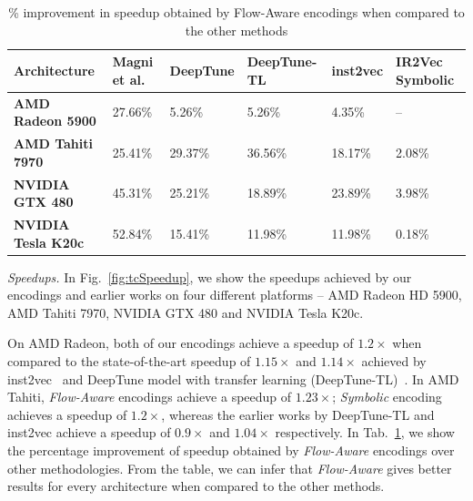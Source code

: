 \begin{table}[h]
\centering
  \caption{\% improvement in speedup obtained by Flow-Aware encodings when compared to the other methods}
  \label{tab:predictionSpeedup-tc}    \small
  \begin{tabular}{p{2.5cm}p{1.9cm}p{1.6cm}p{1.5cm}p{2.2cm}p{1.5cm}}
    \hline
    \textbf{Architecture} & \textbf{Magni et al. \cite{o2013portable-grewe}} & \textbf{DeepTune \cite{cummins2017end2end}} & \textbf{DeepTune-TL \cite{cummins2017end2end}} & \textbf{inst2vec \cite{ncc}}\footnotemark  & \textbf{IR2Vec  Symbolic}\\
    \hline
    \textbf{AMD Radeon 5900} & 27.66\% & 5.26\% & 5.26\% & 4.35\% & -- \\
    \textbf{AMD Tahiti 7970} & 25.41\% & 29.37\% & 36.56\% & 18.17\% & 2.08\% \\
    \textbf{NVIDIA GTX 480} & 45.31\% & 25.21\% & 18.89\% & 23.89\% & 3.98\%\\
    \textbf{NVIDIA Tesla K20c} & 52.84\% & 15.41\% & 11.98\% & 11.98\% & 0.18\%\\
\hline
\end{tabular}
\end{table}

\textit{Speedups.}
In Fig.~\ref{fig:tcSpeedup}, we show the speedups achieved by our encodings and earlier works on four different platforms -- AMD Radeon HD 5900, AMD Tahiti 7970, NVIDIA GTX 480 and NVIDIA Tesla K20c. 

On AMD Radeon, both of our encodings achieve a speedup of $ 1.2\times$ when compared to the state-of-the-art speedup of $ 1.15\times$ and $ 1.14\times$ achieved by inst2vec~\cite{ncc} and DeepTune model with transfer learning (DeepTune-TL)~\cite{cummins2017end2end}.
In AMD Tahiti, \textit{Flow-Aware} encodings achieve a speedup of $ 1.23\times$; \textit{Symbolic} encoding achieves a speedup of $ 1.2\times$, whereas the earlier works by DeepTune-TL and inst2vec achieve a speedup of $ 0.9\times$ and $ 1.04\times$ respectively. In Tab.~\ref{tab:predictionSpeedup-tc}, we show the percentage improvement of speedup obtained by \textit{Flow-Aware} encodings over other methodologies. From the table, we can infer that \textit{Flow-Aware} gives better results for every architecture when compared to the other methods. 

